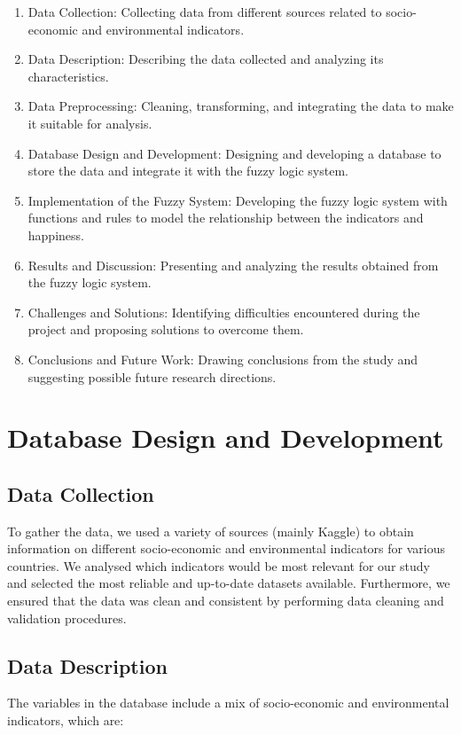 \documentclass[fleqn,11pt]{article}
\begin{document}
\begin{enumerate}
	\item Data Collection: Collecting data from different sources related to socio-economic and environmental indicators.
	\item Data Description: Describing the data collected and analyzing its characteristics.
	\item Data Preprocessing: Cleaning, transforming, and integrating the data to make it suitable for analysis.
	\item Database Design and Development: Designing and developing a database to store the data and integrate it with the fuzzy logic system.
	\item Implementation of the Fuzzy System: Developing the fuzzy logic system with functions and rules to model the relationship between the indicators and happiness.
	\item Results and Discussion: Presenting and analyzing the results obtained from the fuzzy logic system.
	\item Challenges and Solutions: Identifying difficulties encountered during the project and proposing solutions to overcome them.
	\item Conclusions and Future Work: Drawing conclusions from the study and suggesting possible future research directions.
\end{enumerate}



\section{Database Design and Development}

\subsection{Data Collection}
To gather the data, we used a variety of sources (mainly Kaggle) to obtain information on different socio-economic and environmental indicators for various countries.
We analysed which indicators would be most relevant for our study and selected the most reliable and up-to-date datasets available.
Furthermore, we ensured that the data was clean and consistent by performing data cleaning and validation procedures.

\subsection{Data Description}
The variables in the database include a mix of socio-economic and environmental indicators, which are:
\end{document}
